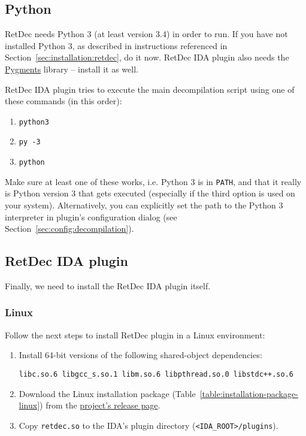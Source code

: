 \documentclass[pdftex, a4paper,12pt, oneside, svgnames]{article}
\begin{document}
\subsection{Python}
\label{sec:installation:python}
RetDec needs Python 3 (at least version 3.4) in order to run. If you have not installed Python 3, as described in instructions referenced in Section~\ref{sec:installation:retdec}, do it now. RetDec IDA plugin also needs the \href{http://pygments.org/}{Pygments} library -- install it as well.

RetDec IDA plugin tries to execute the main decompilation script using one of these commands (in this order):
\begin{enumerate}
    \item \texttt{python3}
    \item \texttt{py -3}
    \item \texttt{python}
\end{enumerate}
Make sure at least one of these works, i.e. Python 3 is in \texttt{PATH}, and that it really is Python version 3 that gets executed (especially if the third option is used on your system). Alternatively, you can explicitly set the path to the Python 3 interpreter in plugin's configuration dialog (see Section~\ref{sec:config:decompilation}).

\subsection{RetDec IDA plugin}
Finally, we need to install the RetDec IDA plugin itself.

\subsubsection{Linux}
Follow the next steps to install RetDec plugin in a Linux environment:
\begin{enumerate}
	\item Install 64-bit versions of the following shared-object dependencies:
\begin{verbatim}
libc.so.6 libgcc_s.so.1 libm.so.6 libpthread.so.0 libstdc++.so.6
\end{verbatim}
	\item Download the Linux installation package (Table~\ref{table:installation-package-linux}) from the \href{https://github.com/avast-tl/retdec-idaplugin/releases}{project's release page}.
	\item Copy \texttt{retdec.so} to the IDA's plugin directory (\texttt{<IDA\_ROOT>/plugins}).
\end{enumerate}
\end{document}
